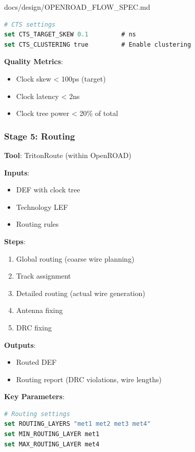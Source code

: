\begin{relocated}{docs/design/OPENROAD_FLOW_SPEC.md}
\begin{lstlisting}[language=tcl]
# CTS settings
set CTS_TARGET_SKEW 0.1         # ns
set CTS_CLUSTERING true         # Enable clustering
\end{lstlisting}

\textbf{Quality Metrics}:

\begin{itemize}
\tightlist
\item
  Clock skew \textless{} 100ps (target)
\item
  Clock latency \textless{} 2ns
\item
  Clock tree power \textless{} 20\% of total
\end{itemize}

\subsubsection{Stage 5: Routing}\label{tm:pd:openroad-flow:stage-5-routing}

\textbf{Tool}: TritonRoute (within OpenROAD)

\textbf{Inputs}:

\begin{itemize}
\tightlist
\item
  DEF with clock tree
\item
  Technology LEF
\item
  Routing rules
\end{itemize}

\textbf{Steps}:

\begin{enumerate}
\def\labelenumi{\arabic{enumi}.}
\tightlist
\item
  Global routing (coarse wire planning)
\item
  Track assignment
\item
  Detailed routing (actual wire generation)
\item
  Antenna fixing
\item
  DRC fixing
\end{enumerate}

\textbf{Outputs}:

\begin{itemize}
\tightlist
\item
  Routed DEF
\item
  Routing report (DRC violations, wire lengths)
\end{itemize}

\textbf{Key Parameters}:

\begin{lstlisting}[language=tcl]
# Routing settings
set ROUTING_LAYERS "met1 met2 met3 met4"
set MIN_ROUTING_LAYER met1
set MAX_ROUTING_LAYER met4
\end{lstlisting}


\end{relocated}
